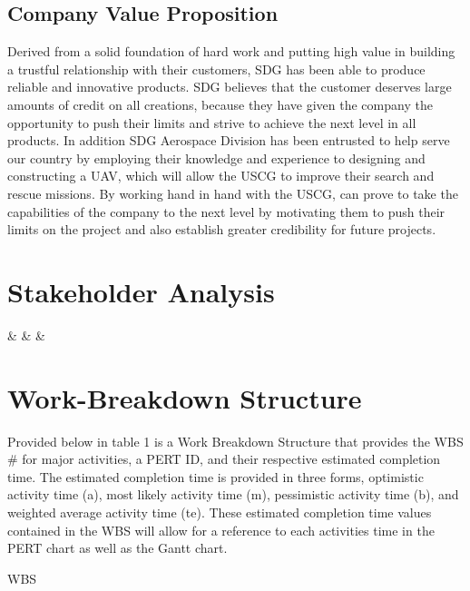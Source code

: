 \documentclass{article}
\begin{document}
\subsection{Company Value Proposition}
Derived from a solid foundation of hard work and putting high value in building a trustful relationship with their customers, SDG has been able to produce reliable and innovative products. SDG believes that the customer deserves large amounts of credit on all creations, because they have given the company the opportunity to push their limits and strive to achieve the next level in all products. In addition SDG Aerospace Division has been entrusted to help serve our country by employing their knowledge and experience to designing and constructing a UAV, which will allow the USCG to improve their search and rescue missions. By working hand in hand with the USCG, can prove to take the capabilities of the company to the next level by motivating them to push their limits on the project and also establish greater credibility for future projects.

\section{Stakeholder Analysis}

\begin{landscape}
	\begin{table}
	\centering
	
	{\csvcoli & \csvcolii & \csvcoliii & \csvcoliv}		
	
	\end{table}
	
	
	
	
\end{landscape}

\section{Work-Breakdown Structure}
Provided below in table 1 is a Work Breakdown Structure that provides the WBS \# for major activities, a PERT ID, and their respective estimated completion time. The estimated completion time is provided in three forms, optimistic activity time (a), most likely activity time (m), pessimistic activity time (b), and weighted average activity time (te). These estimated completion time values contained in the WBS will allow for a reference to each activities time in the PERT chart as well as the Gantt chart.

\begin{landscape}
	\begin{table}
	\caption{WBS}
	\label{tableWBS}
	\end{table}
\end{landscape}
\end{document}
